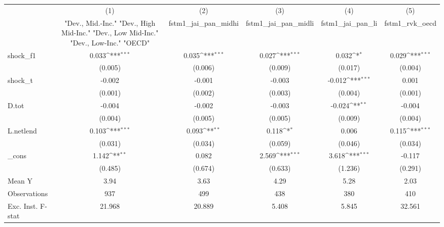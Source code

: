 {
\def\sym#1{\ifmmode^{#1}\else\(^{#1}\)\fi}
\begin{tabular}{l*{5}{c}}
\toprule
            &\multicolumn{1}{c}{(1)}&\multicolumn{1}{c}{(2)}&\multicolumn{1}{c}{(3)}&\multicolumn{1}{c}{(4)}&\multicolumn{1}{c}{(5)}\\
            &\multicolumn{1}{c}{ "Dev., Mid.-Inc." "Dev., High Mid-Inc." "Dev., Low Mid-Inc." "Dev., Low-Inc." "OECD" }&\multicolumn{1}{c}{fstm1\_jai\_pan\_midhi}&\multicolumn{1}{c}{fstm1\_jai\_pan\_midli}&\multicolumn{1}{c}{fstm1\_jai\_pan\_li}&\multicolumn{1}{c}{fstm1\_rvk\_oecd}\\
\midrule
shock\_f1    &       0.033\sym{***}&       0.035\sym{***}&       0.027\sym{***}&       0.032\sym{*}  &       0.029\sym{***}\\
            &     (0.005)         &     (0.006)         &     (0.009)         &     (0.017)         &     (0.004)         \\
\addlinespace
shock\_t     &      -0.002         &      -0.001         &      -0.003         &      -0.012\sym{***}&       0.001         \\
            &     (0.001)         &     (0.002)         &     (0.003)         &     (0.004)         &     (0.001)         \\
\addlinespace
D.tot       &      -0.004         &      -0.002         &      -0.003         &      -0.024\sym{**} &      -0.004         \\
            &     (0.004)         &     (0.005)         &     (0.005)         &     (0.009)         &     (0.004)         \\
\addlinespace
L.netlend   &       0.103\sym{***}&       0.093\sym{**} &       0.118\sym{*}  &       0.006         &       0.115\sym{***}\\
            &     (0.031)         &     (0.034)         &     (0.059)         &     (0.046)         &     (0.034)         \\
\addlinespace
\_cons      &       1.142\sym{**} &       0.082         &       2.569\sym{***}&       3.618\sym{***}&      -0.117         \\
            &     (0.485)         &     (0.674)         &     (0.633)         &     (1.236)         &     (0.291)         \\
\midrule
Mean Y      &        3.94         &        3.63         &        4.29         &        5.28         &        2.03         \\
Observations&         937         &         499         &         438         &         380         &         410         \\
Exc. Inst. F-stat&      21.968         &      20.889         &       5.408         &       5.845         &      32.561         \\
\bottomrule
\end{tabular}
}
